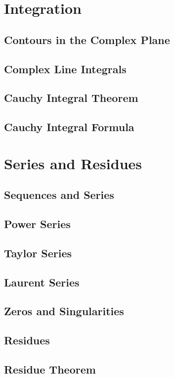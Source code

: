 \newpage
\section{Integration}

\subsection{Contours in the Complex Plane}

\subsection{Complex Line Integrals}

\subsection{Cauchy Integral Theorem}

\subsection{Cauchy Integral Formula}


\newpage
\section{Series and Residues}

\subsection{Sequences and Series}

\subsection{Power Series}

\subsection{Taylor Series}

\subsection{Laurent Series}

\subsection{Zeros and Singularities}

\subsection{Residues}

\subsection{Residue Theorem}


